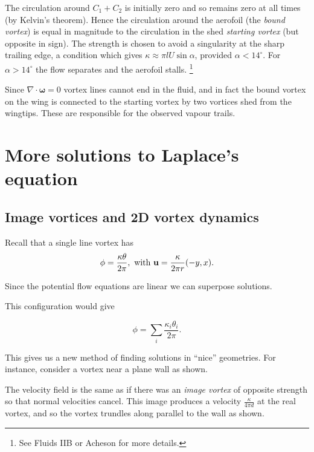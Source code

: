 \documentclass{notes}
\newcommand{\bso}{\boldsymbol\omega}
\newcommand{\divr}{\nabla\cdot}
\begin{document}
\vspace{1.5in}

The circulation around $C_1 + C_2$ is initially zero and so remains
zero at all times (by Kelvin's theorem).  Hence the circulation around
the aerofoil (the \emph{bound vortex}) is equal in magnitude to the
circulation in the shed \emph{starting vortex} (but opposite in
sign).  The strength is chosen to avoid a singularity at the sharp
trailing edge, a condition which gives $\kappa \approx \pi l U \sin
\alpha$, provided $\alpha < 14^\circ$.  For $\alpha > 14^\circ$ the
 flow separates and the aerofoil stalls.%
\footnote{See Fluids IIB or Acheson for more details.} 

Since $\divr\bso = 0$ vortex lines cannot end in the fluid, and in
fact the bound vortex on the wing is connected to the starting vortex
by two vortices shed from the wingtips.  These are responsible for the
observed vapour trails.

\vspace{1.5in}

\section{More solutions to Laplace's equation}

\subsection{Image vortices and 2D vortex dynamics}

Recall that a single line vortex has
\[
\phi = \frac{\kappa \theta}{2 \pi}, \text{ with } \mathbf{u} = \frac{\kappa}{2
  \pi r} (-y,x).
\]

Since the potential flow equations are linear we can superpose
solutions.

\vspace{1.5in}

This configuration would give

\[
\phi = \sum_i \frac{\kappa_i \theta_i}{2 \pi}.
\]

This gives us a new method of finding solutions in ``nice''
geometries.  For instance, consider a vortex near a plane wall as
shown.

\vspace{2in}

The velocity field is the same as if there was an \emph{image vortex}
of opposite strength so that normal velocities cancel.  This image
produces a velocity $\frac{\kappa}{4 \pi d}$ at the real vortex, and
so the vortex trundles along parallel to the wall as shown.
\end{document}
